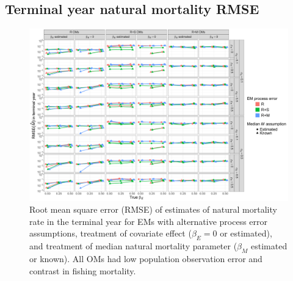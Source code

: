 \documentclass[
  12pt,
]{article}
\begin{document}
\hypertarget{terminal-year-natural-mortality-rmse}{%
\subsection*{Terminal year natural mortality RMSE}\label{terminal-year-natural-mortality-rmse}}

\begin{landscape}
\begin{figure}
\begin{center}
\includegraphics[height = \textheight]{terminal_year_M_rmse_main}
\end{center}
\caption{Root mean square error (RMSE) of estimates of natural mortality rate in the terminal year for EMs with alternative process error assumptions, treatment of covariate effect ($\beta_E = 0$ or estimated), and treatment of median natural mortality parameter ($\beta_M$ estimated or known). All OMs had low population observation error and contrast in fishing mortality.}\label{terminal_M_rmse}
\end{figure}
\end{landscape}
\end{document}
